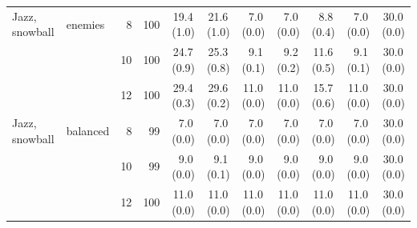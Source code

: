 \begin{table}[p]
{\begin{tabular}{llrrrrrrrrr}
\addlinespace[1pt]
Jazz, snowball & enemies & 8 & 100 & 19.4\,{\scriptsize(1.0)} & 21.6\,{\scriptsize(1.0)} & 7.0\,{\scriptsize(0.0)} & 7.0\,{\scriptsize(0.0)} & 8.8\,{\scriptsize(0.4)} & 7.0\,{\scriptsize(0.0)} & 30.0\,{\scriptsize(0.0)} \\
 &  & 10 & 100 & 24.7\,{\scriptsize(0.9)} & 25.3\,{\scriptsize(0.8)} & 9.1\,{\scriptsize(0.1)} & 9.2\,{\scriptsize(0.2)} & 11.6\,{\scriptsize(0.5)} & 9.1\,{\scriptsize(0.1)} & 30.0\,{\scriptsize(0.0)} \\
 &  & 12 & 100 & 29.4\,{\scriptsize(0.3)} & 29.6\,{\scriptsize(0.2)} & 11.0\,{\scriptsize(0.0)} & 11.0\,{\scriptsize(0.0)} & 15.7\,{\scriptsize(0.6)} & 11.0\,{\scriptsize(0.0)} & 30.0\,{\scriptsize(0.0)} \\
\addlinespace[1pt]
Jazz, snowball & balanced & 8 & 99 & 7.0\,{\scriptsize(0.0)} & 7.0\,{\scriptsize(0.0)} & 7.0\,{\scriptsize(0.0)} & 7.0\,{\scriptsize(0.0)} & 7.0\,{\scriptsize(0.0)} & 7.0\,{\scriptsize(0.0)} & 30.0\,{\scriptsize(0.0)} \\
 &  & 10 & 99 & 9.0\,{\scriptsize(0.0)} & 9.1\,{\scriptsize(0.1)} & 9.0\,{\scriptsize(0.0)} & 9.0\,{\scriptsize(0.0)} & 9.0\,{\scriptsize(0.0)} & 9.0\,{\scriptsize(0.0)} & 30.0\,{\scriptsize(0.0)} \\
 &  & 12 & 100 & 11.0\,{\scriptsize(0.0)} & 11.0\,{\scriptsize(0.0)} & 11.0\,{\scriptsize(0.0)} & 11.0\,{\scriptsize(0.0)} & 11.0\,{\scriptsize(0.0)} & 11.0\,{\scriptsize(0.0)} & 30.0\,{\scriptsize(0.0)} \\
\bottomrule
\end{tabular}}
\end{table}
